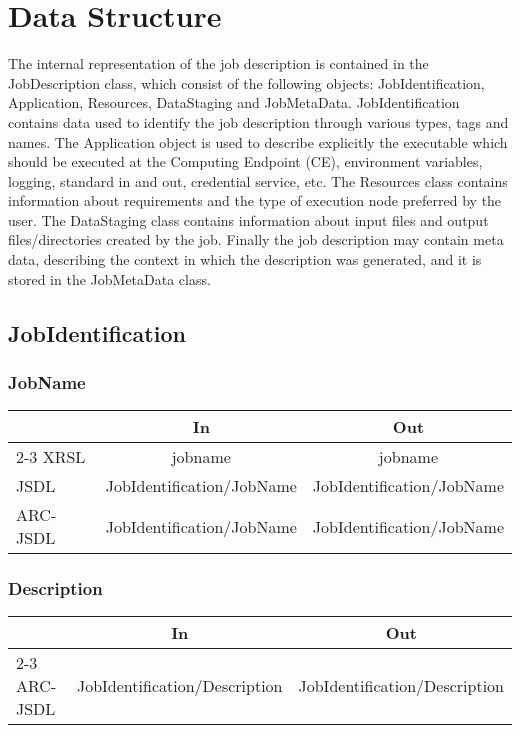 \documentclass{article}
\newenvironment{inouttabular}%
{\begin{center}\begin{tabular}{l>{\ttfamily\footnotesize}c>{\ttfamily\footnotesize}c}%
\toprule
& \textnormal{\normalsize{In}} & \textnormal{\normalsize{Out}}\\ \cmidrule{2-3}}
{\bottomrule\end{tabular}\end{center}}
\begin{document}
\section{Data Structure}
The internal representation of the job description is contained in the
JobDescription class, which consist of the following objects:
JobIdentification, Application, Resources, DataStaging and JobMetaData.
JobIdentification contains data used to identify the job description
through various types, tags and names. The Application object is used
to describe explicitly the executable which should be executed at the
Computing Endpoint (CE), environment variables, logging, standard in
and out, credential service, etc. The Resources class contains
information about requirements and the type of execution node preferred
by the user. The DataStaging class contains information about input
files and output files/directories created by the job. Finally the job
description may contain meta data, describing the context in which the
description was generated, and it is stored in the JobMetaData class.

\subsection{JobIdentification}
\subsubsection{JobName}
\begin{table}[h]
\begin{inouttabular}
XRSL & jobname & jobname\\
JSDL & JobIdentification/JobName & JobIdentification/JobName\\
ARC-JSDL & JobIdentification/JobName & JobIdentification/JobName \\
\end{inouttabular}
\end{table}

\subsubsection{Description}
\begin{table}[h]
\begin{inouttabular}
ARC-JSDL & JobIdentification/Description & JobIdentification/Description\\
\end{inouttabular}
\end{table}
\end{document}
